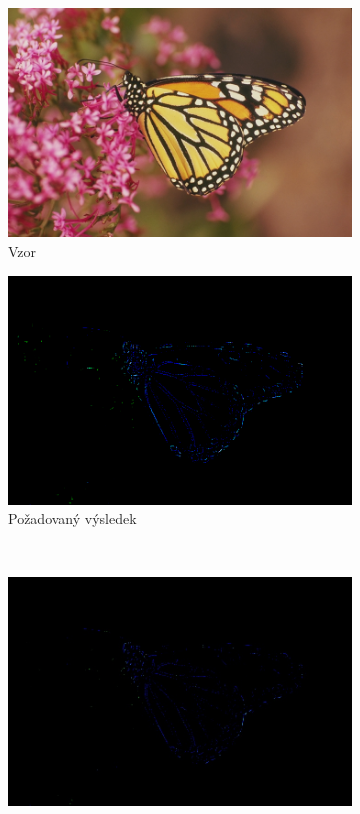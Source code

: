 \documentclass[a4paper,11pt]{scrartcl}
\begin{document}
\begin{figure}[!h]
    \centering
    \begin{subfigure}[b]{0.32\textwidth}
        \includegraphics[width=\textwidth]{img/example3.png}
        \caption{Vzor}
        \label{fig:gull}
    \end{subfigure}
    \begin{subfigure}[b]{0.32\textwidth}
        \includegraphics[width=\textwidth]{img/example3_E.png}
        \caption{Požadovaný výsledek}
        \label{fig:gull}
    \end{subfigure}
    \\
    \begin{subfigure}[b]{0.32\textwidth}
        \includegraphics[width=\textwidth]{img/tournament-blx_a-ssim-dynamic_example3.jpg}

\end{subfigure}
\end{figure}
\end{document}
